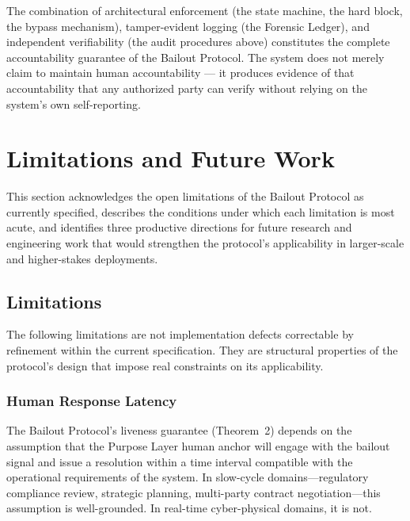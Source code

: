 \documentclass[12pt]{article}
\begin{document}
The combination of architectural enforcement (the state machine, the hard block, the bypass mechanism), tamper-evident logging (the Forensic Ledger), and independent verifiability (the audit procedures above) constitutes the complete accountability guarantee of the Bailout Protocol. The system does not merely claim to maintain human accountability — it produces evidence of that accountability that any authorized party can verify without relying on the system's own self-reporting.


\section{Limitations and Future Work}\label{sec:limitations}

This section acknowledges the open limitations of the Bailout Protocol as currently specified, describes the conditions under which each limitation is most acute, and identifies three productive directions for future research and engineering work that would strengthen the protocol's applicability in larger-scale and higher-stakes deployments.

\subsection{Limitations}\label{sec:limitations:subsection}

The following limitations are not implementation defects correctable by refinement within the current specification. They are structural properties of the protocol's design that impose real constraints on its applicability.

\subsubsection{Human Response Latency}\label{sec:human-response-latency}

The Bailout Protocol's liveness guarantee (Theorem~2) depends on the assumption that the Purpose Layer human anchor will engage with the bailout signal and issue a resolution within a time interval compatible with the operational requirements of the system. In slow-cycle domains---regulatory compliance review, strategic planning, multi-party contract negotiation---this assumption is well-grounded. In real-time cyber-physical domains, it is not.
\end{document}
